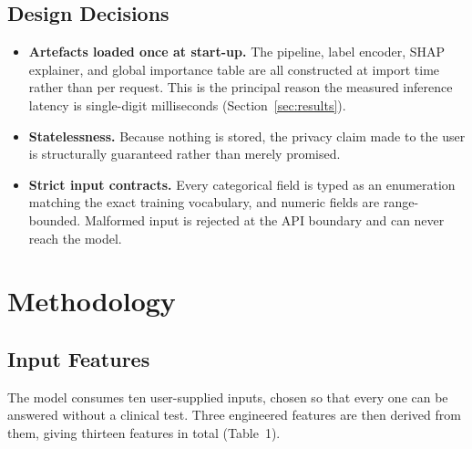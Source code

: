 \documentclass[11pt,a4paper]{article}
\begin{document}
\subsection{Design Decisions}
\begin{itemize}
  \item \textbf{Artefacts loaded once at start-up.} The pipeline, label encoder,
        SHAP explainer, and global importance table are all constructed at
        import time rather than per request. This is the principal reason the
        measured inference latency is single-digit milliseconds
        (Section~\ref{sec:results}).
  \item \textbf{Statelessness.} Because nothing is stored, the privacy claim
        made to the user is structurally guaranteed rather than merely
        promised.
  \item \textbf{Strict input contracts.} Every categorical field is typed as an
        enumeration matching the exact training vocabulary, and numeric fields
        are range-bounded. Malformed input is rejected at the API boundary and
        can never reach the model.
\end{itemize}

\section{Methodology}

\subsection{Input Features}
The model consumes ten user-supplied inputs, chosen so that every one can be
answered without a clinical test. Three engineered features are then derived
from them, giving thirteen features in total (Table~1).
\end{document}
